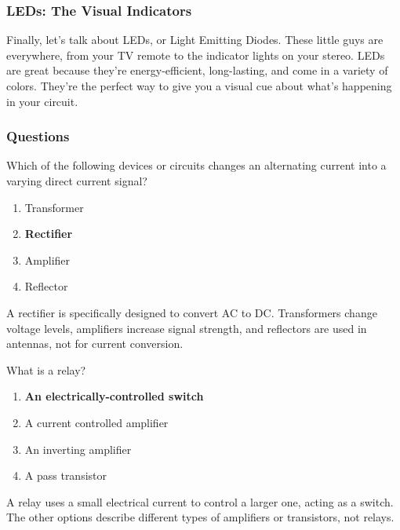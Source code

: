 \subsubsection*{LEDs: The Visual Indicators}
Finally, let's talk about LEDs, or Light Emitting Diodes. These little guys are everywhere, from your TV remote to the indicator lights on your stereo. LEDs are great because they’re energy-efficient, long-lasting, and come in a variety of colors. They’re the perfect way to give you a visual cue about what’s happening in your circuit.





\subsubsection*{Questions}

\begin{tcolorbox}[colback=gray!10!white,colframe=black!75!black,title={T6D01}]
Which of the following devices or circuits changes an alternating current into a varying direct current signal?
\begin{enumerate}[label=\Alph*),noitemsep]
    \item Transformer
    \item \textbf{Rectifier}
    \item Amplifier
    \item Reflector
\end{enumerate}
\end{tcolorbox}
A rectifier is specifically designed to convert AC to DC. Transformers change voltage levels, amplifiers increase signal strength, and reflectors are used in antennas, not for current conversion.

\begin{tcolorbox}[colback=gray!10!white,colframe=black!75!black,title={T6D02}]
What is a relay?
\begin{enumerate}[label=\Alph*),noitemsep]
    \item \textbf{An electrically-controlled switch}
    \item A current controlled amplifier
    \item An inverting amplifier
    \item A pass transistor
\end{enumerate}
\end{tcolorbox}
A relay uses a small electrical current to control a larger one, acting as a switch. The other options describe different types of amplifiers or transistors, not relays.

